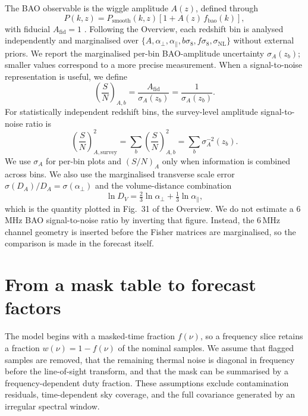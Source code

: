 The BAO observable is the wiggle amplitude $A(z)$, defined through
\begin{equation}
\label{eq:wiggle}
P(k,z) = P_\mathrm{smooth}(k,z)\left[1 + A(z)\,f_\mathrm{bao}(k)\right],
\end{equation}
with fiducial $A_\mathrm{fid}=1$ \citep{SeoEisenstein2007,Bull2015}.
Following the Overview, each redshift bin is analysed independently and
marginalised over $\{A,\alpha_\perp,\alpha_\parallel,b\sigma_8,
f\sigma_8,\sigma_\mathrm{NL}\}$ without external priors. We report the
marginalised per-bin BAO-amplitude uncertainty $\sigma_A(z_b)$; smaller
values correspond to a more precise measurement. When a signal-to-noise
representation is useful, we define
\begin{equation}
\label{eq:snr-bin}
\left(\frac{S}{N}\right)_{\!A,b} =
\frac{A_\mathrm{fid}}{\sigma_A(z_b)} = \frac{1}{\sigma_A(z_b)}.
\end{equation}
For statistically independent redshift bins, the survey-level amplitude
signal-to-noise ratio is
\begin{equation}
\label{eq:snr-survey}
\left(\frac{S}{N}\right)_{\!A,\mathrm{survey}}^{2} =
\sum_b \left(\frac{S}{N}\right)_{\!A,b}^{2} =
\sum_b \sigma_A^{-2}(z_b).
\end{equation}
We use $\sigma_A$ for per-bin plots and $(S/N)_A$ only when information
is combined across bins. We also use the marginalised transverse scale
error $\sigma(D_A)/D_A = \sigma(\alpha_\perp)$ and the volume-distance
combination
\begin{equation}
\label{eq:dv}
\ln D_V = \tfrac{2}{3}\ln\alpha_\perp + \tfrac{1}{3}\ln\alpha_\parallel,
\end{equation}
which is the quantity plotted in Fig.~31 of the Overview. We do not
estimate a 6\,MHz BAO signal-to-noise ratio by inverting that figure.
Instead, the 6\,MHz channel geometry is inserted before the Fisher
matrices are marginalised, so the comparison is made in the forecast
itself.

\section{From a mask table to forecast factors}
\label{sec:mapping}

The model begins with a masked-time fraction $f(\nu)$, so a frequency
slice retains a fraction $w(\nu)=1-f(\nu)$ of the nominal samples. We
assume that flagged samples are removed, that the remaining thermal
noise is diagonal in frequency before the line-of-sight transform, and
that the mask can be summarised by a frequency-dependent duty fraction.
These assumptions exclude contamination residuals, time-dependent sky
coverage, and the full covariance generated by an irregular spectral window.


